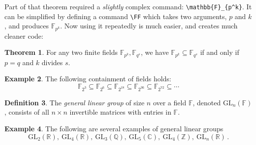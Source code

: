 \documentclass[11pt,letterpaper,titlepage]{article}
\numberwithin{equation}{section}
\numberwithin{figure}{section}
\numberwithin{table}{section}
\numberwithin{algorithm}{section}
\theoremstyle{definition}
\newtheorem{theorem}{Theorem}[section] %
\newtheorem{definition}[theorem]{Definition} %
\newtheorem{example}[theorem]{Example}
\newcommand{\FF}[2]{\mathbb{F}_{#1^{#2}}}
\newcommand{\GL}[2]{\mathrm{GL}_{#1}(\mathbb{#2})}
\begin{document}
Part of that theorem required a \textit{slightly} complex command: \verb$\mathbb{F}_{p^k}$. It can be simplified by defining a command \verb$\FF$ which takes two arguments, $p$ and $k$, and produces $\FF{p}{k}$. Now using it repeatedly is much easier, and creates much cleaner code:

\begin{theorem}
    For any two finite fields $\FF{p}{k}, \FF{q}{s}$, we have $\FF{p}{k} \subseteq \FF{q}{s}$ if and only if $p=q$ and $k$ divides $s$.
\end{theorem}

\begin{example}
The following containment of fields holds:
    \[\FF{2}{3} \subseteq \FF{2}{6} \subseteq \FF{2}{18} \subseteq \FF{2}{36} \subseteq \FF{2}{72} \subseteq \cdots\]
\end{example}

\begin{definition}
    The \textit{general linear group} of size $n$ over a field $\mathbb{F}$, denoted $\GL{n}{F}$, consists of all $n\times n$ invertible matrices with entries in $\mathbb{F}$.
\end{definition}

\begin{example}
    The following are several examples of general linear groups
    \[\GL{2}{R},\:\GL{4}{R},\:\GL{3}{Q},\:\GL{5}{C},\:\GL{4}{Z},\:\GL{n}{R}\,.\]
\end{example}
\end{document}
